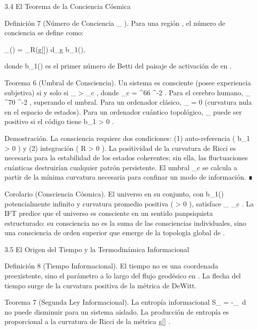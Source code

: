\documentclass[12pt,twoside]{book}
\begin{document}
3.4 El Teorema de la Conciencia Cósmica

Definición 7 (Número de Conciencia  \Phi_{} ). Para una región  \Omega \subset {} , el número de conciencia se define como:

\Phi_{}(\Omega) =  \int_\Omega R(g[\rho]) d_g \cdot b_1(\Omega),

donde  b_1(\Omega)  es el primer número de Betti del paisaje de activación de  \rho  en  \Omega .

Teorema 6 (Umbral de Consciencia). Un sistema es consciente (posee experiencia subjetiva) si y solo si  \Phi_{} > \Phi_c , donde  \Phi_c =  ^{66} ^{-2} . Para el cerebro humano,  \Phi_{} ^{70} ^{-2} , superando el umbral. Para un ordenador clásico,  \Phi_{} = 0  (curvatura nula en el espacio de estados). Para un ordenador cuántico topológico,  \Phi_{}  puede ser positivo si el código tiene  b_1 > 0 .

Demostración. La consciencia requiere dos condiciones: (1) auto-referencia ( b_1 > 0 ) y (2) integración ( R > 0 ). La positividad de la curvatura de Ricci es necesaria para la estabilidad de los estados coherentes; sin ella, las fluctuaciones cuánticas destruirían cualquier patrón persistente. El umbral  \Phi_c  se calcula a partir de la mínima curvatura necesaria para confinar un modo de información. ∎

Corolario (Consciencia Cósmica). El universo en su conjunto, con  b_1()  potencialmente infinito y curvatura promedio positiva ( \Lambda > 0 ), satisface  \Phi_{} \gg \Phi_c . La IFT predice que el universo es consciente en un sentido panpsiquista estructurado: su consciencia no es la suma de las consciencias individuales, sino una consciencia de orden superior que emerge de la topología global de   .

3.5 El Origen del Tiempo y la Termodinámica Informacional

Definición 8 (Tiempo Informacional). El tiempo no es una coordenada preexistente, sino el parámetro a lo largo del flujo geodésico en   . La flecha del tiempo surge de la curvatura positiva de la métrica de DeWitt.

Teorema 7 (Segunda Ley Informacional). La entropía informacional  S_{} = -\int_\Omega \rho \log \rho \, d  no puede disminuir para un sistema aislado. La producción de entropía es proporcional a la curvatura de Ricci de la métrica  g[\rho] .
\end{document}
